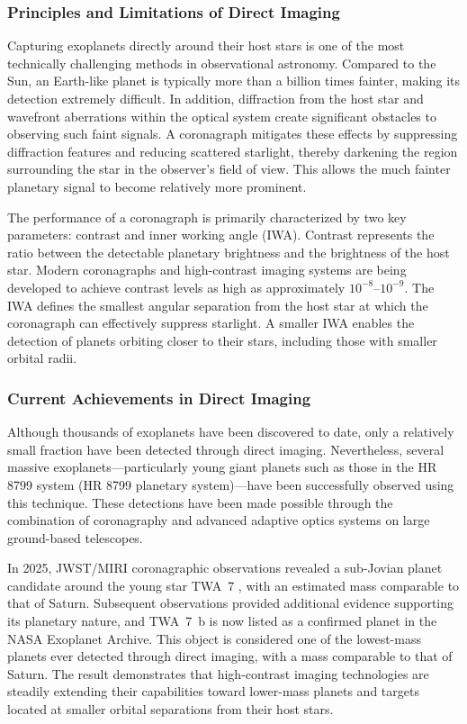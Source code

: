 \subsubsection{Principles and Limitations of Direct Imaging}

Capturing exoplanets directly around their host stars is one of the most technically challenging methods in observational astronomy. Compared to the Sun, an Earth-like planet is typically more than a billion times fainter, making its detection extremely difficult. In addition, diffraction from the host star and wavefront aberrations within the optical system create significant obstacles to observing such faint signals. A coronagraph mitigates these effects by suppressing diffraction features and reducing scattered starlight, thereby darkening the region surrounding the star in the observer's field of view. This allows the much fainter planetary signal to become relatively more prominent.

The performance of a coronagraph is primarily characterized by two key parameters: contrast and inner working angle (IWA). Contrast represents the ratio between the detectable planetary brightness and the brightness of the host star. Modern coronagraphs and high-contrast imaging systems are being developed to achieve contrast levels as high as approximately $10^{-8}$--$10^{-9}$. The IWA defines the smallest angular separation from the host star at which the coronagraph can effectively suppress starlight. A smaller IWA enables the detection of planets orbiting closer to their stars, including those with smaller orbital radii.

\subsubsection{Current Achievements in Direct Imaging}

Although thousands of exoplanets have been discovered to date, only a relatively small fraction have been detected through direct imaging. Nevertheless, several massive exoplanets---particularly young giant planets such as those in the HR 8799 system (HR 8799 planetary system)---have been successfully observed using this technique. These detections have been made possible through the combination of coronagraphy and advanced adaptive optics systems on large ground-based telescopes.

In 2025, JWST/MIRI coronagraphic observations revealed a sub-Jovian planet candidate around the young star TWA~7  \cite{lagrange25}, with an estimated mass comparable to that of Saturn. Subsequent observations provided additional evidence supporting its planetary nature, and TWA~7~b is now listed as a confirmed planet in the NASA Exoplanet Archive. This object is considered one of the lowest-mass planets ever detected through direct imaging, with a mass comparable to that of Saturn. The result demonstrates that high-contrast imaging technologies are steadily extending their capabilities toward lower-mass planets and targets located at smaller orbital separations from their host stars.

